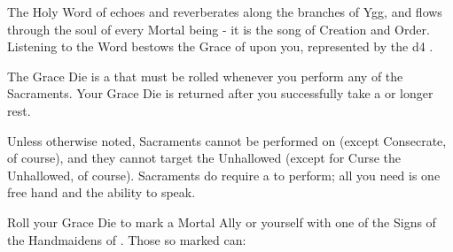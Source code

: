 



    The Holy Word of \TheAuthority echoes and reverberates along the branches of Ygg, and flows through the soul of every Mortal being - it is the song of Creation and Order.  Listening to the Word bestows the Grace of \TheAuthority upon you, represented by the d4 .



    The Grace Die is a  that must be rolled whenever you perform any of the Sacraments. Your Grace Die is returned after you successfully take a  or longer rest.

    Unless otherwise noted, Sacraments cannot be performed on  (except Consecrate, of course), and they cannot target the Unhallowed (except for Curse the Unhallowed, of course).  Sacraments do  require a  to perform; all you need is one free hand and the ability to speak.


   Roll your Grace Die to mark a Mortal Ally or yourself with one of the Signs of the Handmaidens of \TheAuthority. Those so marked can:

\cbreak

\begin{center}
\end{center}


